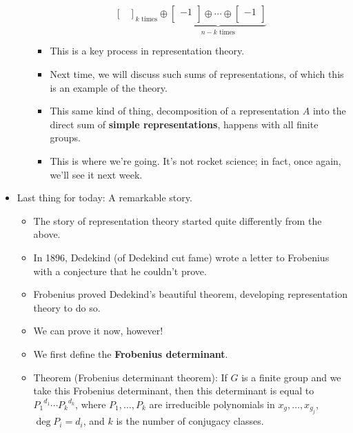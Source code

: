 \documentclass[../notes.tex]{subfiles}
\begin{document}
\begin{itemize}
\begin{itemize}
\begin{equation*}
{\begin{bmatrix}
                \end{bmatrix}
            }_{k\text{ times}}\oplus\underbrace{
                \begin{bmatrix}
                    -1\\
                \end{bmatrix}
                \oplus\cdots\oplus
                \begin{bmatrix}
                    -1\\
                \end{bmatrix}
            }_{n-k\text{ times}}
        \end{equation*}
        \begin{itemize}
            \item This is a key process in representation theory.
            \item Next time, we will discuss such sums of representations, of which this is an example of the theory.
            \item This same kind of thing, decomposition of a representation $A$ into the direct sum of \textbf{simple representations}, happens with all finite groups.
            \item This is where we're going. It's not rocket science; in fact, once again, we'll see it next week.
        \end{itemize}
    \end{itemize}
    \item Last thing for today: A remarkable story.
    \begin{itemize}
        \item The story of representation theory started quite differently from the above.
        \item In 1896, Dedekind (of Dedekind cut fame) wrote a letter to Frobenius with a conjecture that he couldn't prove.
        \item Frobenius proved Dedekind's beautiful theorem, developing representation theory to do so.
        \item We can prove it now, however!
        \item We first define the \textbf{Frobenius determinant}.
        \item Theorem (Frobenius determinant theorem): If $G$ is a finite group and we take this Frobenius determinant, then this determinant is equal to ${P_1}^{d_1}\cdots{P_k}^{d_k}$, where $P_1,\dots,P_k$ are irreducible polynomials in $x_g,\dots,x_{g_j}$, $\deg P_i=d_i$, and $k$ is the number of conjugacy classes.

\end{itemize}
\end{itemize}
\end{document}
